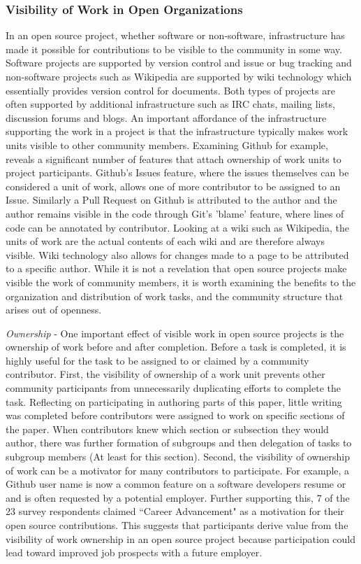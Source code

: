 \subsubsection{Visibility of Work in Open Organizations}

In an open source project, whether software or non-software, infrastructure has made it possible for contributions to be visible to the community in some way. Software projects are supported by version control and issue or bug tracking and non-software projects such as Wikipedia are supported by wiki technology which essentially provides version control for documents. Both types of projects are often supported by additional infrastructure such as IRC chats, mailing lists, discussion forums and blogs. An important affordance of the infrastructure supporting the work in a project is that the infrastructure typically makes work units visible to other community members. Examining Github for example, reveals a significant number of features that attach ownership of work units to project participants. Github's Issues feature, where the issues themselves can be considered a unit of work, allows one of more contributor to be assigned to an Issue. Similarly a Pull Request on Github is attributed to the author and the author remains visible in the code through Git's 'blame' feature, where lines of code can be annotated by contributor. Looking at a wiki such as Wikipedia, the units of work are the actual contents of each wiki and are therefore always visible. Wiki technology also allows for changes made to a page to be attributed to a specific author. While it is not a revelation that open source projects make visible the work of community members, it is worth examining the benefits to the organization and distribution of work tasks, and the community structure that arises out of openness.

{\it Ownership} - One important effect of visible work in open source projects is the ownership of work before and after completion. Before a task is completed, it is highly useful for the task to be assigned to or claimed by a community contributor. First, the visibility of ownership of a work unit prevents other community participants from unnecessarily duplicating efforts to complete the task. Reflecting on participating in authoring parts of this paper, little writing was completed before contributors were assigned to work on specific sections of the paper. When contributors knew which section or subsection they would author, there was further formation of subgroups and then delegation of tasks to subgroup members (At least for this section). Second, the visibility of ownership of work can be a motivator for many contributors to participate. For example, a Github user name is now a common feature on a software developers resume or and is often requested by a potential employer. Further supporting this, 7 of the 23 survey respondents claimed ``Career Advancement" as a motivation for their open source contributions. This suggests that participants derive value from the visibility of work ownership in an open source project because participation could lead toward improved job prospects with a future employer.

